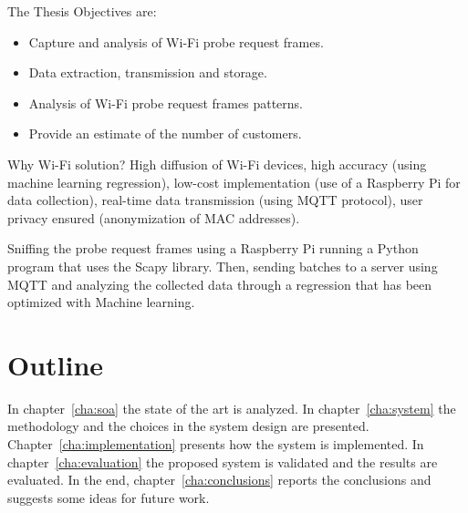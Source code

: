 The Thesis Objectives are:
\begin{itemize}
  \item Capture and analysis of Wi-Fi probe request frames.
  \item Data extraction, transmission and storage.
  \item Analysis of Wi-Fi probe request frames patterns.
  \item Provide an estimate of the number of customers.
\end{itemize}

Why Wi-Fi solution?
High diffusion of Wi-Fi devices, high accuracy (using machine learning regression), low-cost implementation (use of a Raspberry Pi for data collection), real-time data transmission (using MQTT protocol), user privacy ensured (anonymization of MAC addresses).

Sniffing the probe request frames using a Raspberry Pi running a Python program that uses the Scapy library. Then, sending batches to a server using MQTT and analyzing the collected data through a regression that has been optimized with Machine learning.


\section{Outline} 
\label{sec:outline}
\vspace{0.2 cm} 

In chapter~\ref{cha:soa} the state of the art is analyzed.
In chapter~\ref{cha:system} the methodology and the choices in the system design are presented.
Chapter~\ref{cha:implementation}  presents how the system is implemented.
In chapter~\ref{cha:evaluation} the proposed system is validated and the results are evaluated.
In the end, chapter~\ref{cha:conclusions} reports the conclusions and suggests some ideas for future work.
